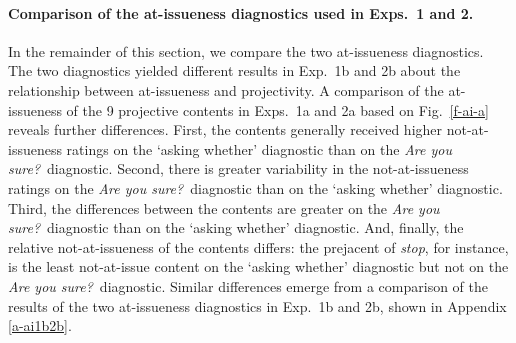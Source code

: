 \documentclass[11pt,fleqn]{article}
\newcommand{\6}{\mbox{$[\hspace*{-.6mm}[$}}
\newcommand{\9}{\mbox{$]\hspace*{-.6mm}]$}}
\newcommand{\figref}[1]{Fig.~\ref{#1}}
\begin{document}
\paragraph{Comparison of the at-issueness diagnostics used in Exps.~1 and 2.} In the remainder of this section, we compare the two at-issueness diagnostics. The two diagnostics yielded different  results in Exp.~1b and 2b about the relationship between at-issueness and projectivity. A comparison of the at-issueness of the 9 projective contents in Exps.~1a and 2a based on \figref{f-ai-a} reveals further differences. First, the contents generally received higher not-at-issueness ratings on the `asking whether' diagnostic than on the {\em Are you sure?}~diagnostic. Second, there is greater variability in the not-at-issueness ratings on the {\em Are you sure?}~diagnostic  than on the `asking whether' diagnostic. Third, the differences between the contents are greater on the {\em Are you sure?}~diagnostic than on the `asking whether' diagnostic. And, finally, the relative not-at-issueness of the contents differs: the prejacent of {\em stop}, for instance, is the least not-at-issue content on the `asking whether' diagnostic but not on the {\em Are you sure?}~diagnostic. Similar differences emerge from a comparison of the results of the two at-issueness diagnostics in Exp.~1b and 2b, shown in Appendix \ref{a-ai1b2b}.
\end{document}
